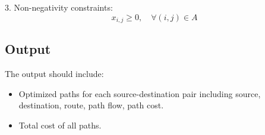 \documentclass{article}
\begin{document}
3. Non-negativity constraints:
\[
x_{i,j} \geq 0, \quad \forall (i,j) \in A
\]

\subsection*{Output}
The output should include:
\begin{itemize}
    \item Optimized paths for each source-destination pair including 
    source, destination, route, path flow, path cost.
    \item Total cost of all paths.
\end{itemize}
\end{document}
